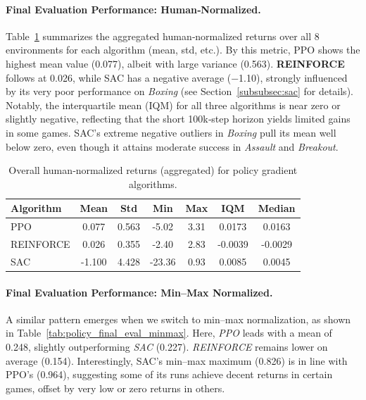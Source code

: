\paragraph{Final Evaluation Performance: Human‐Normalized.}
Table~\ref{tab:policy_final_eval_human} summarizes the aggregated human‐normalized returns over all 8 environments for each algorithm (mean, std, etc.). By this metric, PPO shows the highest mean value (\num{0.077}), albeit with large variance (\num{0.563}). \textbf{REINFORCE} follows at \num{0.026}, while SAC has a negative average (\num{-1.10}), strongly influenced by its very poor performance on \emph{Boxing} (see Section~\ref{subsubsec:sac} for details). Notably, the interquartile mean (IQM) for all three algorithms is near zero or slightly negative, reflecting that the short 100k‐step horizon yields limited gains in some games. SAC's extreme negative outliers in \emph{Boxing} pull its mean well below zero, even though it attains moderate success in \emph{Assault} and \emph{Breakout}.

\begin{table} 
	\centering
	\caption{Overall human‐normalized returns (aggregated) for policy gradient algorithms.}
	\label{tab:policy_final_eval_human}
	\begin{tabular}{lcccccc}
		\toprule
		\textbf{Algorithm} & \textbf{Mean} & \textbf{Std} & \textbf{Min} & \textbf{Max} & \textbf{IQM} & \textbf{Median} \\
		\midrule
		PPO         & 0.077 & 0.563 & -5.02 & 3.31 & 0.0173 & 0.0163 \\
		REINFORCE   & 0.026 & 0.355 & -2.40 & 2.83 & -0.0039 & -0.0029 \\
		SAC         & -1.100 & 4.428 & -23.36 & 0.93 & 0.0085 & 0.0045 \\
		\bottomrule
	\end{tabular}
\end{table}

\paragraph{Final Evaluation Performance: Min–Max Normalized.}
A similar pattern emerges when we switch to min–max normalization, as shown in Table~\ref{tab:policy_final_eval_minmax}. Here, \emph{PPO} leads with a mean of \num{0.248}, slightly outperforming \emph{SAC} (\num{0.227}). \emph{REINFORCE} remains lower on average (\num{0.154}). Interestingly, SAC's min–max maximum (\num{0.826}) is in line with PPO's (\num{0.964}), suggesting some of its runs achieve decent returns in certain games, offset by very low or zero returns in others.

